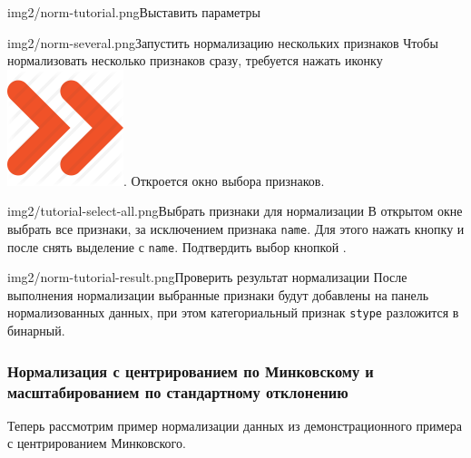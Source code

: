 \documentclass[12pt,tikz]{instruction}
\begin{document}
\begin{steps}
\begin{ist}{img2/norm-tutorial.png}{Выставить параметры}
	\end{ist}	
	\begin{ist}{img2/norm-several.png}{Запустить нормализацию нескольких признаков }
		Чтобы нормализовать несколько признаков сразу, требуется нажать иконку \includegraphics[scale=0.1]{img2/norm_all.png}. Откроется окно выбора признаков.
	\end{ist}
	\begin{ist}{img2/tutorial-select-all.png}{Выбрать признаки для нормализации}
		В открытом окне выбрать все признаки, за исключением признака \texttt{name}. Для этого нажать кнопку  и после снять выделение с \texttt{name}. Подтвердить выбор кнопкой . \vspace{1cm}
	\end{ist}
	\begin{ist}{img2/norm-tutorial-result.png}{Проверить результат нормализации}
		После выполнения нормализации выбранные признаки будут добавлены на панель нормализованных данных, при этом категориальный признак \texttt{stype} разложится в бинарный.
	\end{ist}
\end{steps}

\subsubsection{Нормализация с центрированием по Минковскому и масштабированием по стандартному отклонению}
\label{subsubseq:example_norm2}
Теперь рассмотрим пример нормализации данных из демонстрационного примера с центрированием Минковского.
\end{document}
